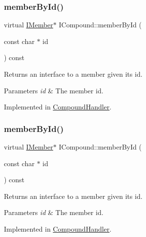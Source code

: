 \subsubsection{\texorpdfstring{memberById()}{memberById()}\hspace{0.1cm}{\footnotesize\ttfamily [1/2]}}
{\footnotesize\ttfamily virtual \mbox{\hyperlink{class_i_member}{I\+Member}}$\ast$ I\+Compound\+::member\+By\+Id (\begin{DoxyParamCaption}\item[{const char $\ast$}]{id }\end{DoxyParamCaption}) const\hspace{0.3cm}{\ttfamily [pure virtual]}}

Returns an interface to a member given its id. 
\begin{DoxyParams}{Parameters}
{\em id} & The member id. \\
\hline
\end{DoxyParams}


Implemented in \mbox{\hyperlink{class_compound_handler_ac73126f245d618162a90bc2f6906c548}{Compound\+Handler}}.

\mbox{\label{class_i_compound_af30652d3b5a43722e9407c8edf9a38fb}} 
\subsubsection{\texorpdfstring{memberById()}{memberById()}\hspace{0.1cm}{\footnotesize\ttfamily [2/2]}}
{\footnotesize\ttfamily virtual \mbox{\hyperlink{class_i_member}{I\+Member}}$\ast$ I\+Compound\+::member\+By\+Id (\begin{DoxyParamCaption}\item[{const char $\ast$}]{id }\end{DoxyParamCaption}) const\hspace{0.3cm}{\ttfamily [pure virtual]}}

Returns an interface to a member given its id. 
\begin{DoxyParams}{Parameters}
{\em id} & The member id. \\
\hline
\end{DoxyParams}


Implemented in \mbox{\hyperlink{class_compound_handler_ac73126f245d618162a90bc2f6906c548}{Compound\+Handler}}.


